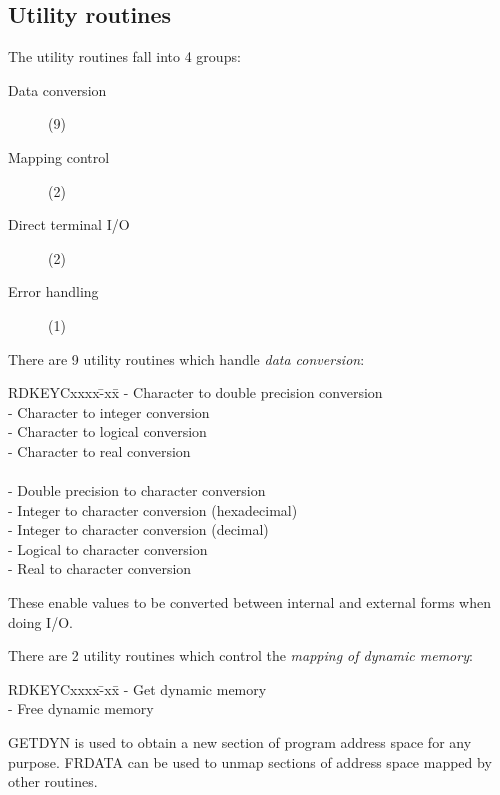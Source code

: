 \subsection {Utility routines}
The utility routines fall into 4 groups:
\begin{description}
\begin{description}
\item [Data conversion] (9)
\item [Mapping control] (2)
\item [Direct terminal I/O] (2)
\item [Error handling] (1)
\end{description}
\end{description}
There are 9 utility routines which handle {\em data conversion}:
\begin{tabbing}
\hspace{40mm}RDKEYCxxxx\=-xx\=\kill
\hspace{40mm}{\bf CTOD} \>- \>Character to double precision conversion\\
\hspace{40mm}{\bf CTOI} \>- \>Character to integer conversion\\
\hspace{40mm}{\bf CTOL} \>- \>Character to logical conversion\\
\hspace{40mm}{\bf CTOR} \>- \>Character to real conversion\\
\\
\hspace{40mm}{\bf DTOC} \>- \>Double precision to character conversion\\
\hspace{40mm}{\bf HTOC} \>- \>Integer to character conversion (hexadecimal)\\
\hspace{40mm}{\bf ITOC} \>- \>Integer to character conversion (decimal)\\
\hspace{40mm}{\bf LTOC} \>- \>Logical to character conversion\\
\hspace{40mm}{\bf RTOC} \>- \>Real to character conversion
\end{tabbing}
These enable values to be converted between internal and external forms
when doing I/O.

There are 2 utility routines which control the {\em mapping of dynamic memory}:
\begin{tabbing}
\hspace{40mm}RDKEYCxxxx\=-xx\=\kill
\hspace{40mm}{\bf GETDYN} \>- \>Get dynamic memory\\
\hspace{40mm}{\bf FRDATA} \>- \>Free dynamic memory
\end{tabbing}
GETDYN is used to obtain a new section of program address space for any purpose.
FRDATA can be used to unmap sections of address space mapped by other routines.

